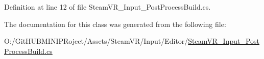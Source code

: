 Definition at line 12 of file Steam\+V\+R\+\_\+\+Input\+\_\+\+Post\+Process\+Build.\+cs.



The documentation for this class was generated from the following file\+:\begin{DoxyCompactItemize}
\item 
O\+:/\+Git\+H\+U\+B\+M\+I\+N\+I\+P\+Roject/\+Assets/\+Steam\+V\+R/\+Input/\+Editor/\mbox{\hyperlink{_steam_v_r___input___post_process_build_8cs}{Steam\+V\+R\+\_\+\+Input\+\_\+\+Post\+Process\+Build.\+cs}}\end{DoxyCompactItemize}
